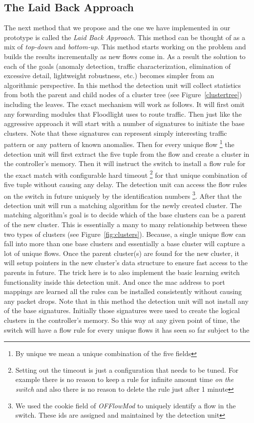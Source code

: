 \documentclass[twocolumn]{article}
\begin{document}
\subsection{The Laid Back Approach}
The next method that we propose and the one we have implemented in our prototype is called the \emph{Laid Back Approach}. This method can be thought of as a mix of \emph{top-down} and \emph{bottom-up}. This method starts working on the problem and builds the results incrementally as new flows come in. As a result the solution to each of the goals (anomaly detection, traffic characterization, elimination of excessive detail, lightweight robustness, etc.) becomes simpler from an algorithmic perspective. In this method the detection unit will collect statistics from both the parent and child nodes of a cluster tree (see Figure~\ref{clustertree}) including the leaves. The exact mechanism will work as follows. It will first omit any forwarding modules that Floodlight uses to route traffic. Then just like the aggressive approach it will start with a number of signatures to initiate the base clusters. Note that these signatures can represent simply interesting traffic pattern or any pattern of known anomalies. Then for every unique flow \footnote{By unique we mean a unique combination of the five fields} the detection unit will first extract the five tuple from the flow and create a cluster in the controller's memory. Then it will instruct the switch to install a flow rule for the exact match with configurable hard timeout \footnote{Setting out the timeout is just a configuration that needs to be tuned. For example there is no reason to keep a rule for infinite amount time \emph{on the switch} and also there is no reason to delete the rule just after 1 minute} for that unique combination of five tuple without causing any delay. The detection unit can access the flow rules on the switch in future uniquely by the identification numbers \footnote{We used the cookie field of \emph{OFFlowMod} to uniquely identify a flow in the switch. These ids are assigned and maintained by the detection unit}. After that the detection unit will run a matching algorithm for the newly created cluster. The matching algorithm's goal is to decide which of the base clusters can be a parent of the new cluster. This is essentially a many to many relationship between these two types of clusters (see Figure~\ref{fig:clusters}). Because, a single unique flow can fall into more than one base clusters and essentially a base cluster will capture a lot of unique flows. Once the parent cluster(s) are found for the new cluster, it will setup pointers in the new cluster's data structure to ensure fast access to the parents in future. The trick here is to also implement the basic learning switch functionality inside this detection unit. And once the mac address to port mappings are learned all the rules can be installed consistently without causing any packet drops. Note that in this method the detection unit will not install any of the base signatures. Initially those signatures were used to create the logical clusters in the controller's memory. So this way at any given point of time, the switch will have a flow rule for every unique flows it has seen so far subject to the 
\end{document}
